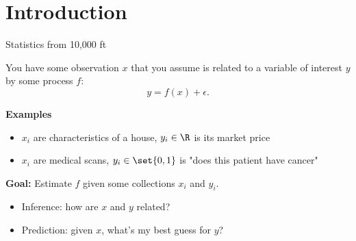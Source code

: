 \section{Introduction}

\begin{frame}{Statistics from 10,000 ft}

	You have some observation $x$ that you assume is related to a variable of interest $y$ by some process $f$:
	\begin{equation}
		y = f(x) + \epsilon.
	\end{equation}

	\pause \bigskip

	\textbf{Examples}

	\begin{itemize}
		\item ${x_i}$ are characteristics of a house, ${y_i} \in \R$ is its market price
		\item ${x_i}$ are medical scans, ${y_i} \in \set{0, 1}$ is "does this patient have cancer"
	\end{itemize}

	\pause \bigskip

	\textbf{Goal:} Estimate $f$ given some collections ${x_i}$ and ${y_i}$.

	\begin{itemize}
		\item Inference: how are $x$ and $y$ related?
		\item Prediction: given $x$, what's my best guess for $y$?
	\end{itemize}
\end{frame}

